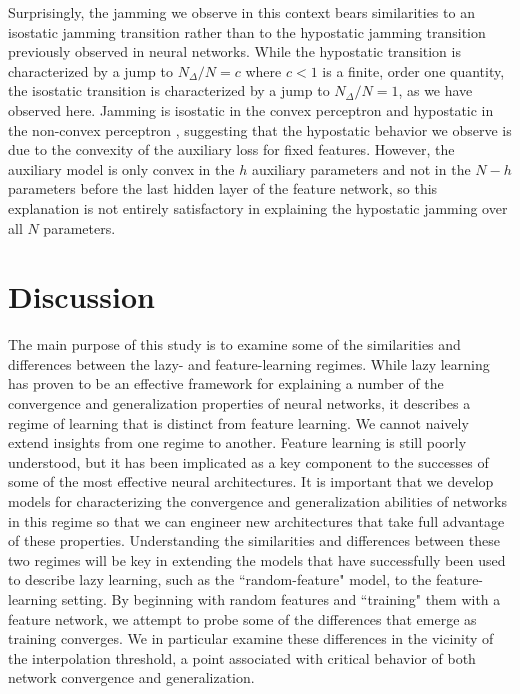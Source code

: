 \documentclass[11pt]{article}
\begin{document}
Surprisingly, the jamming we observe in this context bears similarities to an isostatic jamming transition rather than to the hypostatic jamming transition previously observed in neural networks. While the hypostatic transition is characterized by a jump to $N_\Delta/N = c$ where $c < 1$ is a finite, order one quantity, the isostatic transition is characterized by a jump to $N_\Delta/N=1$, as we have observed here. Jamming is isostatic in the convex perceptron and hypostatic in the non-convex perceptron \cite{franzSimplestModelJamming2016}, suggesting that the hypostatic behavior we observe is due to the convexity of the auxiliary loss for fixed features. However, the auxiliary model is only convex in the $h$ auxiliary parameters and not in the $N-h$ parameters before the last hidden layer of the feature network, so this explanation is not entirely satisfactory in explaining the hypostatic jamming over all $N$ parameters.\\


\section{Discussion}
\label{Discussion}

The main purpose of this study is to examine some of the similarities and differences between the lazy- and feature-learning regimes. While lazy learning has proven to be an effective framework for explaining a number of the convergence and generalization properties of neural networks, it describes a regime of learning that is distinct from feature learning. We cannot naively extend insights from one regime to another. Feature learning is still poorly understood, but it has been implicated as a key component to the successes of some of the most effective neural architectures. It is important that we develop models for characterizing the convergence and generalization abilities of networks in this regime so that we can engineer new architectures that take full advantage of these properties. Understanding the similarities and differences between these two regimes will be key in extending the models that have successfully been used to describe lazy learning, such as the ``random-feature" model, to the feature-learning setting. By beginning with random features and ``training" them with a feature network, we attempt to probe some of the differences that emerge as training converges. We in particular examine these differences in the vicinity of the interpolation threshold, a point associated with critical behavior of both network convergence and generalization.\\
\end{document}
